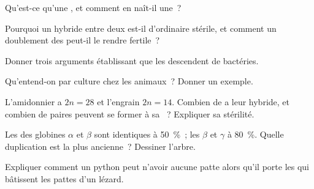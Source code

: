 \begin{exercise}[$\star$]\label{exo:g12:diversification-of-life:2}
Qu'est-ce qu'une , et comment en naît-il une~?
\end{exercise}

\begin{exercise}[$\star$]\label{exo:g12:diversification-of-life:3}
Pourquoi un hybride entre deux  est-il d'ordinaire stérile, et
comment un doublement des  peut-il le rendre fertile~?
\end{exercise}

\begin{exercise}[$\star$]\label{exo:g12:diversification-of-life:4}
Donner trois arguments établissant que les  descendent de
bactéries.
\end{exercise}

\begin{exercise}[$\star$]\label{exo:g12:diversification-of-life:5}
Qu'entend-on par culture chez les animaux~? Donner un exemple.
\end{exercise}

\begin{exercise}[$\star\star$]\label{exo:g12:diversification-of-life:6}
L'amidonnier a $2n = 28$ et l'engrain $2n = 14$. Combien de 
a leur hybride, et combien de paires peuvent se former à sa ~?
Expliquer sa stérilité.
\end{exercise}

\begin{exercise}[$\star\star$]\label{exo:g12:diversification-of-life:7}
Les  des globines $\alpha$ et $\beta$ sont identiques à 50~\%~;
les  $\beta$ et $\gamma$ à 80~\%. Quelle duplication est la plus
ancienne~? Dessiner l'arbre.
\end{exercise}

\begin{exercise}[$\star\star$]\label{exo:g12:diversification-of-life:8}
Expliquer comment un python peut n'avoir aucune patte alors qu'il porte
les  qui bâtissent les pattes d'un lézard.
\end{exercise}

